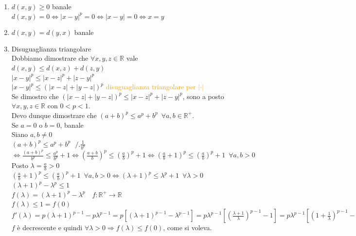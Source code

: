 \documentclass{article}
\newcommand{\R}{\mathbb{R}}
\begin{document}
\begin{enumerate}
    \item $d(x,y)\geq 0$ banale\\
    $d(x,y)=0 \Leftrightarrow |x-y|^p=0 \Leftrightarrow |x-y|=0 \Leftrightarrow x=y$
    \item $d(x,y)=d(y,x)$ banale
    \item Disuguaglianza triangolare\\
    Dobbiamo dimostrare che $\forall x,y,z \in \R$ vale\\
    $d(x,y)\leq d(x,z)+d(z,y)$\\
    $|x-y|^p\leq |x-z|^p+|z-y|^p$\\
    $|x-y|^p\leq (|x-z|+|y-z|)^p$ \textcolor{orange}{disuguaglianza triangolare per $|\cdot|$}\\
    Se dimostro che $(|x-z|+|y-z|)^p \leq |x-z|^p+|z-y|^p$, sono a posto $\forall x,y,z \in \R$ con $0<p<1$.\\
    Devo dunque dimostrare che $(a+b)^p\leq a^p+b^p \,\,\, \forall a,b\in\R^+$.\\
    Se $a=0$ o $b=0$, banale\\
    Siano $a,b\neq 0$\\
    $(a+b)^p\leq a^p+b^p\,\,\,\, /.\frac{1}{b^p}$\\
    $\Leftrightarrow \frac{(a+b)^p}{b^p}\leq \frac{a^p}{b^p}+1 \Leftrightarrow \left( \frac{a+b}{b} \right)^p \leq \left( \frac{a}{b} \right)^p +1 \Leftrightarrow \left( \frac{a}{b} +1 \right)^p \leq \left( \frac{a}{b} \right)^p +1 \,\,\, \forall a,b >0$\\
    Posto $\lambda = \frac{a}{b}>0$\\
    $\left( \frac{a}{b}+1 \right)^p \leq \left( \frac{a}{b} \right)^p +1\,\,\, \forall a,b>0 \Leftrightarrow (\lambda+1)^p\leq \lambda^p +1 \,\,\, \forall \lambda>0$\\
    $(\lambda+1)^p-\lambda^p\leq 1$\\
    $f(\lambda)=(\lambda +1)^p-\lambda^p\,\,\,\,\,\,f:\R^+\rightarrow\R$\\
    $f(\lambda)\leq 1=f(0)$\\
    $f'(\lambda)=p(\lambda+1)^{p-1}-p\lambda^{p-1}=p[(\lambda+1)^{p-1}-\lambda^{p-1}]=p\lambda^{p-1}\left[\left( \frac{\lambda+1}{\lambda} \right)^{p-1}-1\right]= p\lambda^{p-1} \left[ \left( 1+\frac{1}{\lambda} \right)^{p-1} -1\right] = <0\,\,\, \forall\lambda >0$\\
    $f$ è decrescente e quindi $\forall \lambda>0 \Rightarrow f(\lambda)\leq f(0)$, come si voleva.
\end{enumerate}
\end{document}
